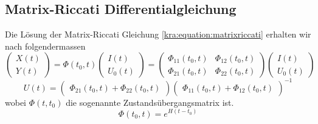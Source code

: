 \subsection{Matrix-Riccati Differentialgleichung} \label{kra:loesung:riccati}
Die Lösung der Matrix-Riccati Gleichung \ref{kra:equation:matrixriccati} erhalten wir nach \cite{kra:kalmanisae} folgendermassen
\begin{equation}
    \label{kra:matrixriccati-solution}
    \begin{pmatrix}
        X(t) \\
        Y(t)
    \end{pmatrix}
    =
    \Phi(t_0, t)
    \begin{pmatrix}
        I(t) \\
        U_0(t)
    \end{pmatrix}
    =
    \begin{pmatrix}
        \Phi_{11}(t_0, t) & \Phi_{12}(t_0, t) \\
        \Phi_{21}(t_0, t) & \Phi_{22}(t_0, t)
    \end{pmatrix}
    \begin{pmatrix}
        I(t) \\
        U_0(t)
    \end{pmatrix}
\end{equation}
\begin{equation}
    U(t) =
    \begin{pmatrix}
        \Phi_{21}(t_0, t) + \Phi_{22}(t_0, t)
    \end{pmatrix}
    \begin{pmatrix}
        \Phi_{11}(t_0, t) + \Phi_{12}(t_0, t)
    \end{pmatrix}
    ^{-1}
\end{equation}
wobei $\Phi(t, t_0)$ die sogenannte Zustandsübergangsmatrix ist.
\begin{equation}
    \Phi(t_0, t) = e^{H(t - t_0)}
\end{equation}
